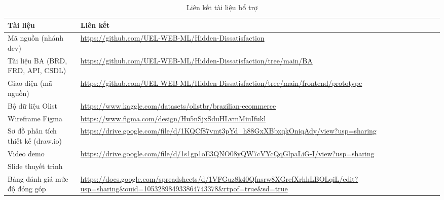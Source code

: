 \documentclass[12pt,a4paper]{report}
\begin{document}
\begin{table}[htbp]
\centering
\small
\caption{Liên kết tài liệu bổ trợ}
\label{tab:supplementary-links}
\begin{tabular}{|L{4.1cm}|L{10.1cm}|}
\hline
\textbf{Tài liệu} & \textbf{Liên kết} \\
\hline
Mã nguồn (nhánh dev) &
\url{https://github.com/UEL-WEB-ML/Hidden-Dissatisfaction} \\
\hline
Tài liệu BA (BRD, FRD, API, CSDL) &
\url{https://github.com/UEL-WEB-ML/Hidden-Dissatisfaction/tree/main/BA} \\
\hline
Giao diện (mã nguồn) &
\url{https://github.com/UEL-WEB-ML/Hidden-Dissatisfaction/tree/main/frontend/prototype} \\
\hline
Bộ dữ liệu Olist &
\url{https://www.kaggle.com/datasets/olistbr/brazilian-ecommerce} \\
\hline
Wireframe Figma &
\url{https://www.figma.com/design/Hu5nSjxSduHLvmMiuIfukl} \\
\hline
Sơ đồ phân tích thiết kế (draw.io) &
\url{https://drive.google.com/file/d/1KQCf87vmt3pYd_h88GxXBbxqkOniqAdy/view?usp=sharing} \\
\hline
Video demo &
\url{https://drive.google.com/file/d/1s1gp1oE3QNO08yQW7cVYcQqGlpaLiG-I/view?usp=sharing} \\
\hline
Slide thuyết trình &
\url{} \\
\hline
Bảng đánh giá mức độ đóng góp &
\url{https://docs.google.com/spreadsheets/d/1VFGuz8k40Qfnsrw8XGrefXrhhLBOLqiL/edit?usp=sharing&ouid=105328984933864743378&rtpof=true&sd=true} \\
\hline
\end{tabular}
\end{table}
\end{document}
